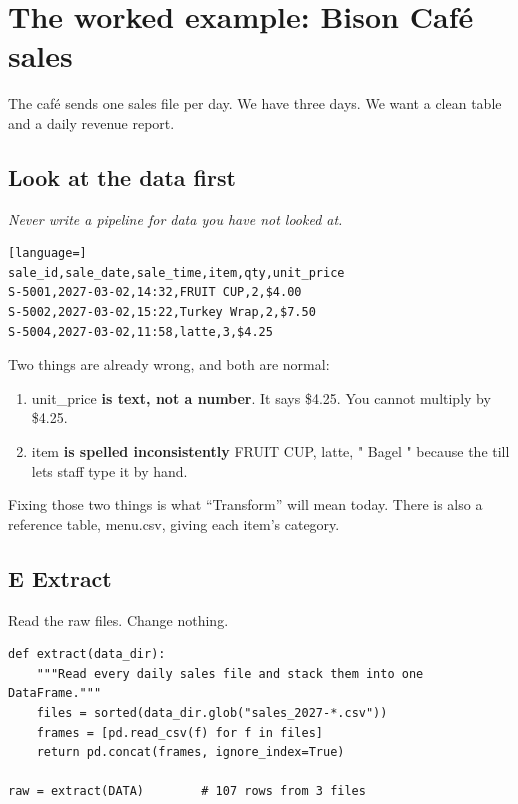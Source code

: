 \documentclass[11pt,letterpaper]{article}
\newcommand{\py}[1]{{\ttfamily\small#1}}
\begin{document}
\section{The worked example: Bison Caf\'e sales}

The caf\'e sends one sales file per day. We have three days. We want a clean table and a daily
revenue report.

\subsection{Look at the data first}

\emph{Never write a pipeline for data you have not looked at.}

\begin{lstlisting}[language=]
sale_id,sale_date,sale_time,item,qty,unit_price
S-5001,2027-03-02,14:32,FRUIT CUP,2,$4.00
S-5002,2027-03-02,15:22,Turkey Wrap,2,$7.50
S-5004,2027-03-02,11:58,latte,3,$4.25
\end{lstlisting}

Two things are already wrong, and both are normal:

\begin{enumerate}
  \item \py{unit\_price} \textbf{is text, not a number}. It says \py{\$4.25}. You cannot multiply by
        \py{\$4.25}.
  \item \py{item} \textbf{is spelled inconsistently} \textemdash{} \py{FRUIT CUP}, \py{latte},
        \py{"  Bagel "} \textemdash{} because the till lets staff type it by hand.
\end{enumerate}

Fixing those two things is what ``Transform'' will mean today. There is also a reference table,
\py{menu.csv}, giving each item's category.

\subsection{E \textemdash{} Extract}

Read the raw files. Change nothing.

\begin{lstlisting}
def extract(data_dir):
    """Read every daily sales file and stack them into one DataFrame."""
    files = sorted(data_dir.glob("sales_2027-*.csv"))
    frames = [pd.read_csv(f) for f in files]
    return pd.concat(frames, ignore_index=True)

raw = extract(DATA)        # 107 rows from 3 files
\end{lstlisting}
\end{document}
